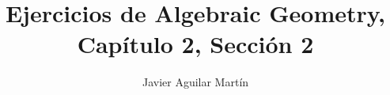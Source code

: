 \documentclass[twoside]{article}
\begin{document}
\title{Ejercicios de Algebraic Geometry, Capítulo 2, Sección 2}
\author{Javier Aguilar Martín}
\maketitle


%
%
%
%
%
%
%
%
%
%
\end{document}
